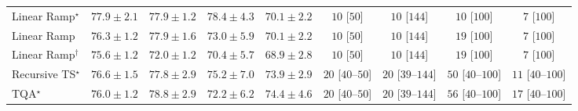\begin{tabular}{l|cccc|cccc|}
Linear Ramp$^\star$ & {\cellcolor[HTML]{894DA3}} \color[HTML]{F1F1F1} $77.9\pm 2.1$ & {\cellcolor[HTML]{894DA3}} \color[HTML]{F1F1F1} $77.9\pm 1.2$ & {\cellcolor[HTML]{8948A0}} \color[HTML]{F1F1F1} $78.4\pm 4.3$ & {\cellcolor[HTML]{8D98C7}} \color[HTML]{F1F1F1} $70.1\pm 2.2$ & {\cellcolor[HTML]{FFF7F3}} \color[HTML]{000000} $10$ [$50$] & {\cellcolor[HTML]{FFF7F3}} \color[HTML]{000000} $10$ [$144$] & {\cellcolor[HTML]{FFF7F3}} \color[HTML]{000000} $10$ [$100$] & {\cellcolor[HTML]{FFF7F3}} \color[HTML]{000000} $7$ [$100$] \\
Linear Ramp & {\cellcolor[HTML]{8B5CAA}} \color[HTML]{F1F1F1} $76.3\pm 1.2$ & {\cellcolor[HTML]{894DA3}} \color[HTML]{F1F1F1} $77.9\pm 1.6$ & {\cellcolor[HTML]{8C7CB9}} \color[HTML]{F1F1F1} $73.0\pm 5.9$ & {\cellcolor[HTML]{8D98C7}} \color[HTML]{F1F1F1} $70.1\pm 2.2$ & {\cellcolor[HTML]{FFF7F3}} \color[HTML]{000000} $10$ [$50$] & {\cellcolor[HTML]{FFF7F3}} \color[HTML]{000000} $10$ [$144$] & {\cellcolor[HTML]{FFF5F1}} \color[HTML]{000000} $19$ [$100$] & {\cellcolor[HTML]{FFF7F3}} \color[HTML]{000000} $7$ [$100$] \\
Linear Ramp$^\dagger$ & {\cellcolor[HTML]{8B62AD}} \color[HTML]{F1F1F1} $75.6\pm 1.2$ & {\cellcolor[HTML]{8C85BE}} \color[HTML]{F1F1F1} $72.0\pm 1.2$ & {\cellcolor[HTML]{8C95C6}} \color[HTML]{F1F1F1} $70.4\pm 5.7$ & {\cellcolor[HTML]{92A3CD}} \color[HTML]{F1F1F1} $68.9\pm 2.8$ & {\cellcolor[HTML]{FFF7F3}} \color[HTML]{000000} $10$ [$50$] & {\cellcolor[HTML]{FFF7F3}} \color[HTML]{000000} $10$ [$144$] & {\cellcolor[HTML]{FFF5F1}} \color[HTML]{000000} $19$ [$100$] & {\cellcolor[HTML]{FFF7F3}} \color[HTML]{000000} $7$ [$100$] \\
Recursive TS$^\star$ & {\cellcolor[HTML]{8A59A8}} \color[HTML]{F1F1F1} $76.6\pm 1.5$ & {\cellcolor[HTML]{894FA3}} \color[HTML]{F1F1F1} $77.8\pm 2.9$ & {\cellcolor[HTML]{8C66AF}} \color[HTML]{F1F1F1} $75.2\pm 7.0$ & {\cellcolor[HTML]{8C74B5}} \color[HTML]{F1F1F1} $73.9\pm 2.9$ & {\cellcolor[HTML]{FFF4F0}} \color[HTML]{000000} $20$ [$40$--$50$] & {\cellcolor[HTML]{FFF4F0}} \color[HTML]{000000} $20$ [$39$--$144$] & {\cellcolor[HTML]{FEEEEA}} \color[HTML]{000000} $50$ [$40$--$100$] & {\cellcolor[HTML]{FFF6F2}} \color[HTML]{000000} $11$ [$40$--$100$] \\
TQA$^\star$ & {\cellcolor[HTML]{8B60AC}} \color[HTML]{F1F1F1} $76.0\pm 1.2$ & {\cellcolor[HTML]{88449E}} \color[HTML]{F1F1F1} $78.8\pm 2.9$ & {\cellcolor[HTML]{8C84BD}} \color[HTML]{F1F1F1} $72.2\pm 6.2$ & {\cellcolor[HTML]{8C6EB3}} \color[HTML]{F1F1F1} $74.4\pm 4.6$ & {\cellcolor[HTML]{FFF4F0}} \color[HTML]{000000} $20$ [$40$--$50$] & {\cellcolor[HTML]{FFF4F0}} \color[HTML]{000000} $20$ [$39$--$144$] & {\cellcolor[HTML]{FEECE9}} \color[HTML]{000000} $56$ [$40$--$100$] & {\cellcolor[HTML]{FFF5F1}} \color[HTML]{000000} $17$ [$40$--$100$] \\

\end{tabular}
